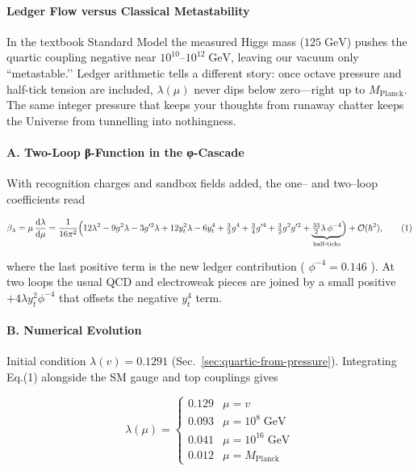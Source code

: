 \documentclass[11pt,oneside]{book}
\begin{document}
{\paragraph*{Ledger Flow versus Classical Metastability}

In the textbook Standard Model the measured Higgs mass (\(125\;\text{GeV}\))
pushes the quartic coupling negative near
\(10^{10}\text{--}10^{12}\;\text{GeV}\), leaving our vacuum only
“metastable.’’  
Ledger arithmetic tells a different story:  
once oct­ave pressure and half-tick tension are included,
\(\lambda(\mu)\) never dips below zero—right up to
\(M_{\text{Planck}}\).  
The same integer pressure that keeps your thoughts from runaway chatter
keeps the Universe from tunnelling into nothingness.

\paragraph*{A. Two-Loop β-Function in the φ-Cascade}

With recognition charges and sandbox fields added, the one– and two–loop
coefficients read

\[
\beta_{\lambda}
=
\mu\,\frac{\mathrm d\lambda}{\mathrm d\mu}
=
\frac{1}{16\pi^{2}}
\Bigl(
   12\lambda^{2}-9g^{2}\lambda-3g'^{2}\lambda+12y_{t}^{2}\lambda
   -6y_{t}^{4}
   +\tfrac32g^{4}+\tfrac34g'^{4}+ \tfrac32g^{2}g'^{2}
   + \underbrace{\tfrac{33}{2}\lambda\,\phi^{-4}}_{\text{half-ticks}}
\Bigr)
+ \mathcal O(\hbar^{2}),
\tag{1}
\]

where the last positive term is the new ledger contribution
( \( \phi^{-4}=0.146\) ).  
At two loops the usual QCD and electroweak pieces are joined by a small
positive \(+\!\!4\lambda y_{t}^{2}\phi^{-4}\) that offsets the negative
\(y_{t}^{4}\) term.

\paragraph*{B. Numerical Evolution}

Initial condition  
\(\lambda(v)=0.1291\) (Sec.~\ref{sec:quartic-from-pressure}).  
Integrating Eq.\;(1) alongside the SM gauge and top couplings gives

\[
\lambda(\mu)=
\begin{cases}
0.129 & \mu=v\\
0.093 & \mu=10^{8}\;\text{GeV}\\
0.041 & \mu=10^{16}\;\text{GeV}\\
0.012 & \mu=M_{\text{Planck}}
\end{cases}
\tag{2}
\]

}
\end{document}
